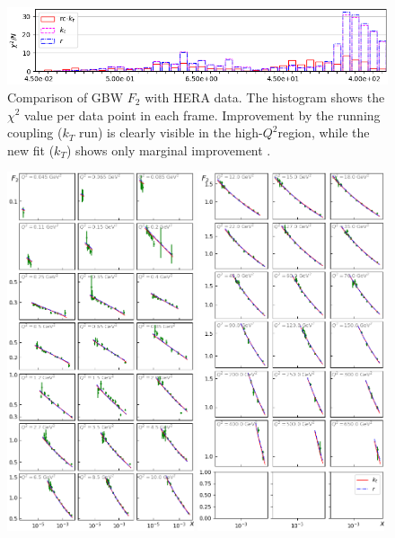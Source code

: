 \documentclass[11pt]{article}
\begin{document}
\begin{figure}[p]
\includegraphics[width=\textwidth]{./plots/Figure_3.png}
\caption{Comparison of GBW $F_2$ with HERA data. The histogram shows the $\chi^2$ value per data point in each frame.
 Improvement by the running coupling ($k_T$ run) is clearly visible in the high-$Q^2$region, while the new fit ($k_T$) shows only marginal improvement .  }
\label{fig:GBW-Grid}
\end{figure}

\begin{figure}[p]
\includegraphics[width=0.49\textwidth]{./plots/Figure_2-1.png}
\includegraphics[width=0.49\textwidth]{./plots/Figure_2-2.png}

\end{figure}
\end{document}
